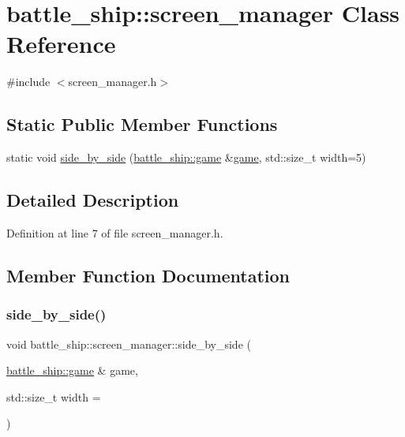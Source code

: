 \hypertarget{classbattle__ship_1_1screen__manager}{}\section{battle\+\_\+ship\+:\+:screen\+\_\+manager Class Reference}
\label{classbattle__ship_1_1screen__manager}


{\ttfamily \#include $<$screen\+\_\+manager.\+h$>$}

\subsection*{Static Public Member Functions}
\begin{DoxyCompactItemize}
\item 
static void \hyperlink{classbattle__ship_1_1screen__manager_a7463dbc1f9adcd2a2ee15d9874b01b01}{side\+\_\+by\+\_\+side} (\hyperlink{classbattle__ship_1_1game}{battle\+\_\+ship\+::game} \&\hyperlink{classbattle__ship_1_1game}{game}, std\+::size\+\_\+t width=5)
\end{DoxyCompactItemize}


\subsection{Detailed Description}


Definition at line 7 of file screen\+\_\+manager.\+h.



\subsection{Member Function Documentation}
\mbox{\label{classbattle__ship_1_1screen__manager_a7463dbc1f9adcd2a2ee15d9874b01b01}} 
\subsubsection{\texorpdfstring{side\+\_\+by\+\_\+side()}{side\_by\_side()}}
{\footnotesize\ttfamily void battle\+\_\+ship\+::screen\+\_\+manager\+::side\+\_\+by\+\_\+side (\begin{DoxyParamCaption}\item[{\hyperlink{classbattle__ship_1_1game}{battle\+\_\+ship\+::game} \&}]{game,  }\item[{std\+::size\+\_\+t}]{width = {} }\end{DoxyParamCaption})\hspace{0.3cm}{\ttfamily [static]}}



